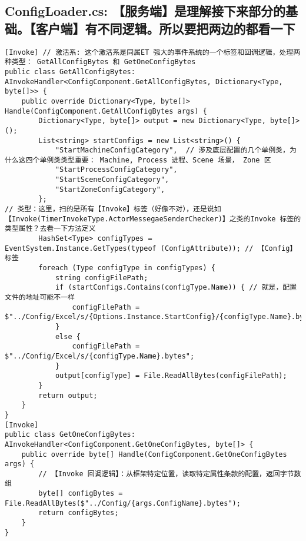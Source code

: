 \documentclass[9pt, b5paper]{article}
\begin{document}
\subsection{ConfigLoader.cs: 【服务端】是理解接下来部分的基础。【客户端】有不同逻辑。所以要把两边的都看一下}
\label{sec-8-4}
\begin{verbatim}
[Invoke] // 激活系: 这个激活系是同属ET 强大的事件系统的一个标签和回调逻辑，处理两种类型： GetAllConfigBytes 和 GetOneConfigBytes
public class GetAllConfigBytes: AInvokeHandler<ConfigComponent.GetAllConfigBytes, Dictionary<Type, byte[]>> {
    public override Dictionary<Type, byte[]> Handle(ConfigComponent.GetAllConfigBytes args) {
        Dictionary<Type, byte[]> output = new Dictionary<Type, byte[]>();
        List<string> startConfigs = new List<string>() {
            "StartMachineConfigCategory",  // 涉及底层配置的几个单例类，为什么这四个单例类类型重要： Machine, Process 进程、Scene 场景， Zone 区
            "StartProcessConfigCategory", 
            "StartSceneConfigCategory", 
            "StartZoneConfigCategory",
        };
// 类型：这里，扫的是所有【Invoke】标签（好像不对），还是说如【Invoke(TimerInvokeType.ActorMessegaeSenderChecker)】之类的Invoke 标签的类型属性？去看一下方法定义
        HashSet<Type> configTypes = EventSystem.Instance.GetTypes(typeof (ConfigAttribute)); // 【Config】标签
        foreach (Type configType in configTypes) {
            string configFilePath;
            if (startConfigs.Contains(configType.Name)) { // 就是，配置文件的地址可能不一样
                configFilePath = $"../Config/Excel/s/{Options.Instance.StartConfig}/{configType.Name}.bytes";    
            }
            else {
                configFilePath = $"../Config/Excel/s/{configType.Name}.bytes";
            }
            output[configType] = File.ReadAllBytes(configFilePath);
        }
        return output;
    }
}
[Invoke]
public class GetOneConfigBytes: AInvokeHandler<ConfigComponent.GetOneConfigBytes, byte[]> {
    public override byte[] Handle(ConfigComponent.GetOneConfigBytes args) {
        // 【Invoke 回调逻辑】：从框架特定位置，读取特定属性条款的配置，返回字节数组
        byte[] configBytes = File.ReadAllBytes($"../Config/{args.ConfigName}.bytes");
        return configBytes;
    }
}
\end{verbatim}
\end{document}
